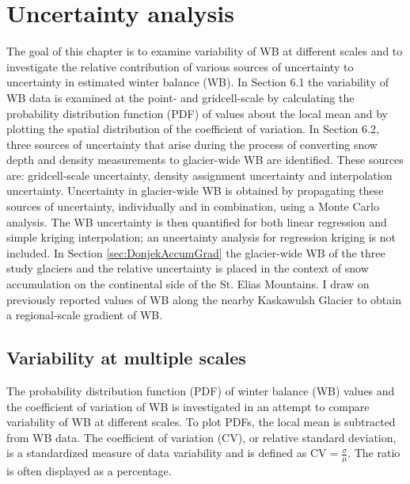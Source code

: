 \documentclass{sfuthesis}
\begin{document}
{%

\chapter{Uncertainty analysis}
\label{sec:UncertaintyAnalysis}

The goal of this chapter is to examine variability of WB at different scales and to investigate the relative contribution of various sources of uncertainty to uncertainty in estimated winter balance (WB). In Section 6.1 the variability of WB data is examined at the point- and gridcell-scale by calculating the probability distribution function (PDF) of values about the local mean and by plotting the spatial distribution of the coefficient of variation. In Section 6.2, three sources of uncertainty that arise during the process of converting snow depth and density measurements to glacier-wide WB are identified. These sources are: gridcell-scale uncertainty, density assignment uncertainty and interpolation uncertainty. Uncertainty in glacier-wide WB is obtained by propagating these sources of uncertainty, individually and in combination, using a Monte Carlo analysis. The WB uncertainty is then quantified for both linear regression and simple kriging interpolation; an uncertainty analysis for regression kriging is not included. In Section \ref{sec:DonjekAccumGrad} the glacier-wide WB of the three study glaciers and the relative uncertainty is placed in the context of snow accumulation on the continental side of the St. Elias Mountains. I draw on previously reported values of WB along the nearby Kaskawulsh Glacier to obtain a regional-scale gradient of WB.

\section{Variability at multiple scales}

The probability distribution function (PDF) of winter balance (WB) values and the coefficient of variation of WB is investigated in an attempt to compare variability of WB at different scales. To plot PDFs, the local mean is subtracted from WB data. The coefficient of variation (CV), or relative standard deviation, is a standardized measure of data variability and is defined as $\mathrm{CV} = \frac{\sigma}{\mu}$. The ratio is often displayed as a percentage.

}
\end{document}
